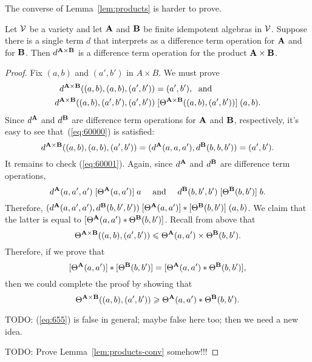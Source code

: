 The converse of Lemma~\ref{lem:products} is harder to prove.
\begin{lem}
  \label{lem:products-conv}
 Let $\mathcal{V}$ be a variety and let $\mathbf{A}$ and $\mathbf{B}$ be finite idempotent
 algebras in $\mathcal{V}$. Suppose there is a single term $d$ that
 interprets as a difference term operation for $\mathbf{A}$ and for $\mathbf{B}$.
 Then $d^{\mathbf{A} \times \mathbf{B}}$ is a difference term operation for the product
 $\mathbf{A} \times \mathbf{B}$.
\end{lem}
\begin{proof}
  Fix $(a, b)$ and $(a', b')$ in $A \times B$.
  We must prove
  \begin{align}
    d^{\bA \times \bB}((a, b), (a, b), (a', b')) &= (a', b'),\; \text{ and } \label{eq:60000}\\
    d^{\bA \times \bB}((a, b), (a', b'), (a', b'))
    &\Comr{\Cg^{\bA \times \bB}((a, b), (a', b'))} (a, b). \label{eq:60001}
  \end{align}
  Since $d^{\mathbf{A}}$ and $d^{\mathbf{B}}$ are difference term operations for $\mathbf{A}$ and
  $\mathbf{B}$, respectively, it's easy to see that~(\ref{eq:60000}) is satisfied:
  \[
  d^{\mathbf{A} \times \mathbf{B}}((a, b), (a, b), (a', b')) =
  (d^{\mathbf{A}}(a, a, a'),  d^{\mathbf{B}}(b, b, b')) = (a', b').
  \]
  It remains to check (\ref{eq:60001}).
  Again, since $d^{\mathbf{A}}$ and
  $d^{\mathbf{B}}$ are difference term operations,
  \[
  d^{\mathbf{A}}(a,a',a')
  \mathrel{[\Theta^{\mathbf{A}}(a,a')]} a \quad \text{ and } \quad
  d^{\mathbf{B}}(b, b', b')
  \mathrel{[\Theta^{\mathbf{B}}(b,b')]} b.
\]
  Therefore, 
  $(d^{\mathbf{A}}(a,a',a'),d^{\mathbf{B}}(b, b', b'))
    \mathrel{[\Theta^{\mathbf{A}}(a,a')]\ast[\Theta^{\mathbf{B}}(b,b')]}
    (a,b)$.
  We claim that the latter is equal to
  $[\Theta^{\mathbf{A}}(a,a') \ast \Theta^{\mathbf{B}}(b,b')]$.
  Recall from above that
  \[
  \Theta^{\mathbf{A} \times \mathbf{B}}((a, b), (a', b'))\leqslant \Theta^{\mathbf{A}}(a,a') \times \Theta^{\mathbf{B}}(b,b').
  \]
  Therefore, if we prove that
  \[
  [\Theta^{\mathbf{A}}(a,a')]  \ast  [\Theta^{\mathbf{B}}(b,b')] = 
  [\Theta^{\mathbf{A}}(a,a') \ast \Theta^{\mathbf{B}}(b,b')],
  \]
  then we could complete the proof by showing that
  \begin{equation}
    \label{eq:655}    
  \Cg^{\bA \times \bB}((a, b), (a', b'))\geq \Cg^{\bA}(a,a') \mytimes \Cg^{\bB}(b,b').
  \end{equation}

  \smallskip

  TODO: (\ref{eq:655}) is false in general; maybe false here
  too; then we need a new idea.

  \medskip
  
  TODO: Prove Lemma~\ref{lem:products-conv} somehow!!!
\end{proof}


